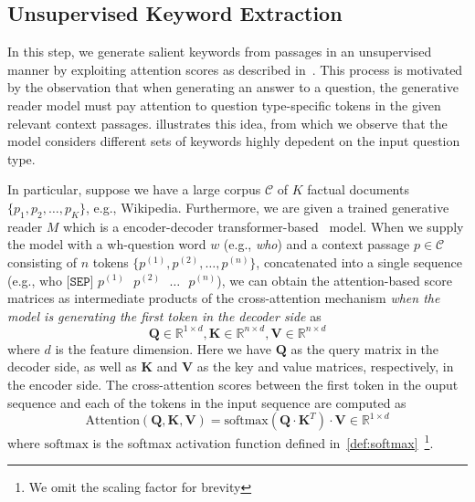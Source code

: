 \subsection{Unsupervised Keyword Extraction}
\label{sec:unsupervised_keyword_extraction}
%
In this step, we generate salient keywords from passages in an unsupervised manner by exploiting attention scores as described in~.
%
This process is motivated by the observation that when generating an answer to a question, the generative reader model must pay attention to question type-specific tokens in the given relevant context passages.
%
 illustrates this idea, from which we observe that the model considers different sets of keywords highly depedent on the input question type.

%
In particular, suppose we have a large corpus $\mathcal{C}$ of $K$ factual documents $\{p_1, p_2, \ldots, p_K\}$, e.g., Wikipedia.
%
Furthermore, we are given a trained generative reader $M$ which is a encoder-decoder transformer-based~\cite{vaswani2017attention} model.
%
When we supply the model with a wh-question word $w$ (e.g., \emph{who}) and a context passage $p \in \mathcal{C}$ consisting of $n$ tokens $\{p^{(1)}, p^{(2)}, \ldots, p^{(n)}\}$, concatenated into a single sequence (e.g., \emph{$\text{who} \texttt{ [SEP] } p^{(1)} \text{ } p^{(2)} \text{ } \ldots \text{ } p^{(n)}$}), we can obtain the attention-based score matrices as intermediate products of the cross-attention mechanism \emph{when the model is generating the first token in the decoder side} as
%
\begin{equation}
%
\mathbf{Q} \in \mathbb{R}^{1 \times d}, \mathbf{K} \in \mathbb{R}^{n \times d}, \mathbf{V} \in \mathbb{R}^{n \times d}
\end{equation}
%
where $d$ is the feature dimension.
%
Here we have $\mathbf{Q}$ as the query matrix in the decoder side, as well as $\mathbf{K}$ and $\mathbf{V}$ as the key and value matrices, respectively, in the encoder side.
%
The cross-attention scores between the first token in the ouput sequence and each of the tokens in the input sequence are computed as
%
\begin{equation}
\text{Attention}(\mathbf{Q}, \mathbf{K}, \mathbf{V}) = \text{softmax}(\mathbf{Q} \cdot \mathbf{K}^{T}) \cdot \mathbf{V} \in \mathbb{R}^{1 \times d}
\end{equation}
%
where $\text{softmax}$ is the softmax activation function defined in~\eqref{def:softmax}~\footnote{We omit the scaling factor for brevity}.
